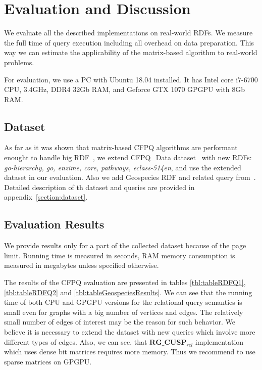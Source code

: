 \section{Evaluation and Discussion}

We evaluate all the described implementations on real-world RDFs.
We measure the full time of query execution including all overhead on data preparation.
This way we can estimate the applicability of the matrix-based algorithm to real-world problems.

For evaluation, we use a PC with Ubuntu 18.04 installed.
It has Intel core i7-6700 CPU, 3.4GHz, DDR4 32Gb RAM, and Geforce GTX 1070 GPGPU with 8Gb RAM.

\subsection{Dataset}
As far as it was shown that matrix-based CFPQ algorithms are performant enought to handle big RDF~\cite{Mishin:2019:ECP:3327964.3328503}, we extend CFPQ\_Data dataset~\cite{Mishin:2019:ECP:3327964.3328503} with new RDFs: \textit{go-hierarchy, go, enzime, core, pathways, eclass-514en}, and use the extended dataset in our evaluation. Also we add Geospecies RDF and related query from~\cite{Kuijpers:2019:ESC:3335783.3335791}. 
Detailed description of th dataset and queries are provided in appendix~\ref{section:dataset}.


\subsection{Evaluation Results}
We provide results only for a part of the collected dataset because of the page limit.
Running time is measured in seconds, RAM memory consumption is measured in megabytes unless specified otherwise.

The results of the CFPQ evaluation are presented in tables \ref{tbl:tableRDFQ1}, \ref{tbl:tableRDFQ2} and \ref{tbl:tableGeospeciesResults}.
We can see that the running time of both CPU and GPGPU versions for the relational query semantics is small even for graphs with a big number of vertices and edges.
The relatively small number of edges of interest may be the reason for such behavior.
We believe it is necessary to extend the dataset with new queries which involve more different types of edges.
Also, we can see, that $\textbf{RG\_CUSP}_{\textit{rel}}$ implementation which uses dense bit matrices requires more memory.
Thus we recommend to use sparse matrices on GPGPU.

